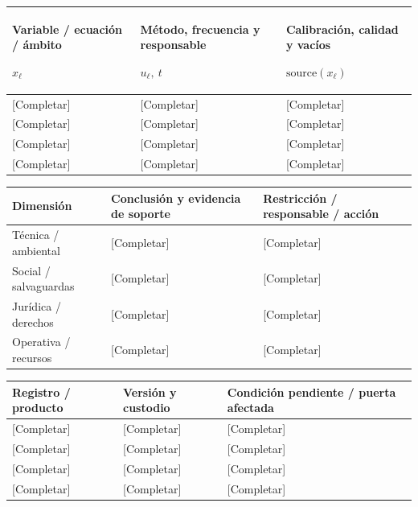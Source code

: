 {\sffamily\fontsize{8.3}{10.3}\selectfont\begin{longtable}{@{}P{49.49mm} P{64.34mm} P{51.14mm}@{}}
\toprule
\textbf{Variable / ecuación / ámbito}\par {\normalfont\fontsize{8.2}{10}\selectfont $x_{\ell}$} & \textbf{Método, frecuencia y responsable}\par {\normalfont\fontsize{8.2}{10}\selectfont $u_{\ell},\ t$} & \textbf{Calibración, calidad y vacíos}\par {\normalfont\fontsize{8.2}{10}\selectfont $\text{source}(x_{\ell})$}\\\midrule\endhead
\rule{0pt}{7.7mm}[Completar] & [Completar] & [Completar]\\\hline
\rule{0pt}{7.7mm}[Completar] & [Completar] & [Completar]\\\hline
\rule{0pt}{7.7mm}[Completar] & [Completar] & [Completar]\\\hline
\rule{0pt}{7.7mm}[Completar] & [Completar] & [Completar]\\\hline
\end{longtable}}
{\sffamily\fontsize{8.3}{10.3}\selectfont\begin{longtable}{@{}P{47.84mm} P{65.99mm} P{51.14mm}@{}}
\toprule
\textbf{Dimensión} & \textbf{Conclusión y evidencia de soporte} & \textbf{Restricción / responsable / acción}\\\midrule\endhead
\rule{0pt}{7.7mm}Técnica / ambiental & [Completar] & [Completar]\\\hline
\rule{0pt}{7.7mm}Social / salvaguardas & [Completar] & [Completar]\\\hline
\rule{0pt}{7.7mm}Jurídica / derechos & [Completar] & [Completar]\\\hline
\rule{0pt}{7.7mm}Operativa / recursos & [Completar] & [Completar]\\\hline
\end{longtable}}
{\sffamily\fontsize{8.3}{10.3}\selectfont\begin{longtable}{@{}P{51.14mm} P{51.14mm} P{62.69mm}@{}}
\toprule
\textbf{Registro / producto} & \textbf{Versión y custodio} & \textbf{Condición pendiente / puerta afectada}\\\midrule\endhead
\rule{0pt}{7.7mm}[Completar] & [Completar] & [Completar]\\\hline
\rule{0pt}{7.7mm}[Completar] & [Completar] & [Completar]\\\hline
\rule{0pt}{7.7mm}[Completar] & [Completar] & [Completar]\\\hline
\rule{0pt}{7.7mm}[Completar] & [Completar] & [Completar]\\\hline
\end{longtable}}
